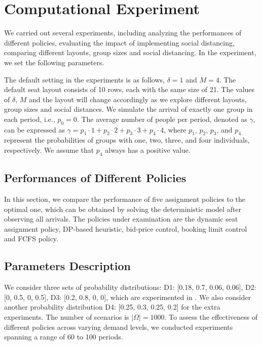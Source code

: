 \section{Computational Experiment}
We carried out several experiments, including analyzing the performances of different policies, evaluating the impact of implementing social distancing, comparing different layouts, group sizes and social distancing. In the experiment, we set the following parameters. 

The default setting in the experiments is as follows, $\delta =1$ and $M =4$. The default seat layout consists of 10 rows, each with the same size of 21. The values of $\delta$, $M$ and the layout will change accordingly as we explore different layouts, group sizes and social distances.
We simulate the arrival of exactly one group in each period, i.e., $p_0 = 0$. The average number of people per period, denoted as $\gamma$, can be expressed as $\gamma = p_1 \cdot 1 + p_2 \cdot 2 + p_3 \cdot 3 + p_4 \cdot 4$, where $p_1$, $p_2$, $p_3$, and $p_4$ represent the probabilities of groups with one, two, three, and four individuals, respectively. We assume that $p_4$ always has a positive value.

\subsection{Performances of Different Policies}
In this section, we compare the performance of five assignment policies to the optimal one, which can be obtained by solving the deterministic model after observing all arrivals. The policies under examination are the dynamic seat assignment policy, DP-based heuristic, bid-price control, booking limit control and FCFS policy.



\subsection*{Parameters Description}
We consider three sets of probability distributions: D1: [0.18, 0.7, 0.06, 0.06], D2: [0, 0.5, 0, 0.5], D3: [0.2, 0.8, 0, 0], which are experimented in \cite{blom2022filling}. We also consider another probability distribution D4: [0.25, 0.3, 0.25, 0.2] for the extra experiments. The number of scenarios is $|\Omega| = 1000$. To assess the effectiveness of different policies across varying demand levels, we conducted experiments spanning a range of 60 to 100 periods. 


